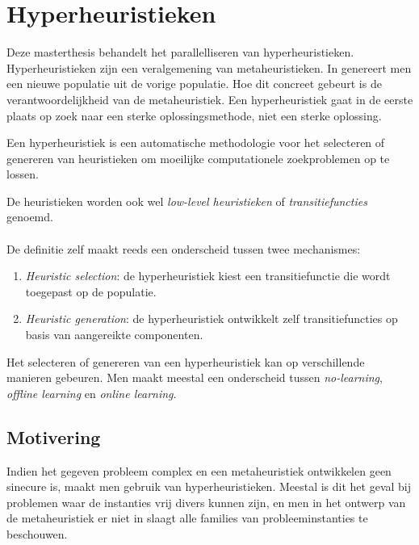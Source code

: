 \section{Hyperheuristieken}

Deze masterthesis behandelt het parallelliseren van hyperheuristieken. Hyperheuristieken zijn een veralgemening van metaheuristieken. In  genereert men een nieuwe populatie uit de vorige populatie. Hoe dit concreet gebeurt is de verantwoordelijkheid van de metaheuristiek. Een hyperheuristiek gaat in de eerste plaats op zoek naar een sterke oplossingsmethode, niet een sterke oplossing.\cite{Burke03hyper-heuristics:an,Kendall01ahyperheuristic,Burke_aclassification}

\begin{definition}
Een hyperheuristiek is een automatische methodologie voor het selecteren of genereren van heuristieken om moeilijke computationele zoekproblemen op te lossen.
\end{definition}
De heuristieken worden ook wel \emph{low-level heuristieken} of \emph{transitiefuncties} genoemd.


\paragraph{}
De definitie zelf maakt reeds een onderscheid tussen twee mechanismes\cite{Burke_aclassification}:
\begin{enumerate}
 \item \emph{Heuristic selection}: de hyperheuristiek kiest een transitiefunctie die wordt toegepast op de populatie.
 \item \emph{Heuristic generation}: de hyperheuristiek ontwikkelt zelf transitiefuncties op basis van aangereikte componenten.
\end{enumerate}

Het selecteren of genereren van een hyperheuristiek kan op verschillende manieren gebeuren. Men maakt meestal een onderscheid tussen \emph{no-learning}, \emph{offline learning} en \emph{online learning}.

\subsection{Motivering}
Indien het gegeven probleem complex en een metaheuristiek ontwikkelen geen sinecure is, maakt men gebruik van hyperheuristieken. Meestal is dit het geval bij problemen waar de instanties vrij divers kunnen zijn, en men in het ontwerp van de metaheuristiek er niet in slaagt alle families van probleeminstanties te beschouwen.


